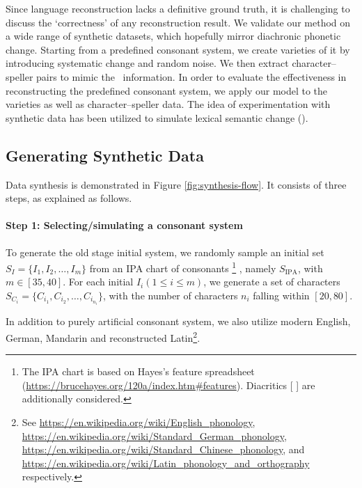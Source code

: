 Since language reconstruction lacks a definitive ground truth, it is challenging to discuss the `correctness' of any reconstruction result.
We validate our method on a wide range of synthetic datasets, which hopefully mirror diachronic phonetic change. 
Starting from a predefined consonant system, we create varieties of it by introducing systematic change and random noise. 
We then extract character--speller pairs to mimic the \fq~information.
In order to evaluate the effectiveness in reconstructing the predefined consonant system, we apply our model to the varieties as well as character--speller data.
The idea of experimentation with synthetic data has been utilized to simulate lexical semantic change (\citealp{rosenfeld-erk-2018-deep,shoemark-etal-2019-room}).

\subsection{Generating Synthetic Data} \label{sec:generate-synthesis}
Data synthesis is demonstrated in Figure \ref{fig:synthesis-flow}.
It consists of three steps, as explained as follows.

\paragraph{Step 1: Selecting/simulating a consonant system}
To generate the old stage initial system, we randomly sample an initial set $S_I=\{I_1, I_2, \dots, I_m\}$ from an IPA chart of consonants
\footnote{The IPA chart is based on Hayes's feature spreadsheet (\url{https://brucehayes.org/120a/index.htm\#features}). 
Diacritics [  ] are additionally considered.
}
, namely $S_{\text{IPA}}$, with $m\in[35,40]$. For each initial $I_i (1 \leq i \leq m)$, we generate a set of characters $S_{C_i}=\{C_{i_1}, C_{i_2}, \dots, C_{i_{n_i}}\}$, with the number of characters $n_i$ falling within $[20,80]$. 

In addition to purely artificial consonant system, we also utilize 
modern English, German, Mandarin and reconstructed Latin\footnote{
See \url{https://en.wikipedia.org/wiki/English_phonology}, 
\url{https://en.wikipedia.org/wiki/Standard_German_phonology},
\url{https://en.wikipedia.org/wiki/Standard_Chinese_phonology}, and \url{https://en.wikipedia.org/wiki/Latin_phonology_and_orthography} respectively.}.


